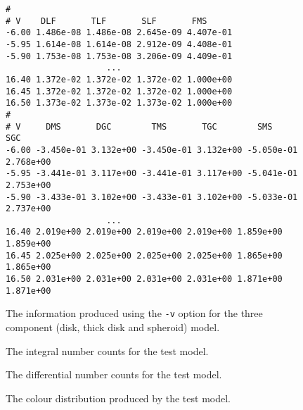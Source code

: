 \documentclass[11pt,twoside]{article}
\begin{document}
\begin{figure}[p]
\begin{center}
\begin{verbatim}
#
# V    DLF       TLF       SLF       FMS
-6.00 1.486e-08 1.486e-08 2.645e-09 4.407e-01
-5.95 1.614e-08 1.614e-08 2.912e-09 4.408e-01
-5.90 1.753e-08 1.753e-08 3.206e-09 4.409e-01
                    ...
16.40 1.372e-02 1.372e-02 1.372e-02 1.000e+00
16.45 1.372e-02 1.372e-02 1.372e-02 1.000e+00
16.50 1.373e-02 1.373e-02 1.373e-02 1.000e+00
#
# V     DMS       DGC        TMS       TGC        SMS       SGC
-6.00 -3.450e-01 3.132e+00 -3.450e-01 3.132e+00 -5.050e-01 2.768e+00
-5.95 -3.441e-01 3.117e+00 -3.441e-01 3.117e+00 -5.041e-01 2.753e+00
-5.90 -3.433e-01 3.102e+00 -3.433e-01 3.102e+00 -5.033e-01 2.737e+00
                    ...
16.40 2.019e+00 2.019e+00 2.019e+00 2.019e+00 1.859e+00 1.859e+00
16.45 2.025e+00 2.025e+00 2.025e+00 2.025e+00 1.865e+00 1.865e+00
16.50 2.031e+00 2.031e+00 2.031e+00 2.031e+00 1.871e+00 1.871e+00
\end{verbatim}
\end{center}
\caption{The information produced using the {\tt -v} option for the three 
component (disk, thick disk and spheroid) model.}
\end{figure}

\begin{figure}[p]
\centerline{}
\caption{The integral number counts for the test model.}
\end{figure}

\begin{figure}[p]
\centerline{}
\caption{The differential number counts for the test model.}
\end{figure}

\begin{figure}[p]
\centerline{}
\caption{The colour distribution produced by the test model.}
\end{figure}

\end{document}
